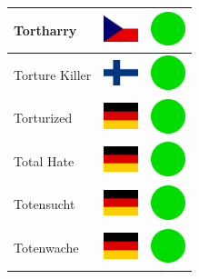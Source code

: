 \documentclass[12pt, a4paper, twoside]{report}
\begin{document}
\begin{center}
\begin{longtable}{|p{5cm}|p{2cm}|p{2cm}|}
 Tortharry                                                  & \includegraphics[width=1cm]{../4x3/cz} &   \includegraphics[width=1cm]{../likes/y} \\ \hline
 Torture Killer                                             & \includegraphics[width=1cm]{../4x3/fi} &   \includegraphics[width=1cm]{../likes/y} \\ \hline
 Torturized                                                 & \includegraphics[width=1cm]{../4x3/de} &   \includegraphics[width=1cm]{../likes/y} \\ \hline
 Total Hate                                                 & \includegraphics[width=1cm]{../4x3/de} &   \includegraphics[width=1cm]{../likes/y} \\ \hline
 Totensucht                                                 & \includegraphics[width=1cm]{../4x3/de} &   \includegraphics[width=1cm]{../likes/y} \\ \hline
 Totenwache                                                 & \includegraphics[width=1cm]{../4x3/de} &   \includegraphics[width=1cm]{../likes/y} \\ \hline

\end{longtable}
\end{center}
\end{document}
